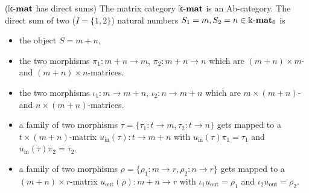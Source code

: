 \begin{example}{($\Bbbk\textnormal{-}\mathbf{mat}$ has direct sums)}\label{ex:kmat_has_direct_sum}
The matrix category $\Bbbk\textnormal{-}\mathbf{mat}$ is an Ab-category. The direct sum of two ($I = \{1,2\}$) natural numbers $S_{1} = m, S_{2} = n \in \Bbbk\textnormal{-}\mathbf{mat}_{0}$ is
\begin{itemize}
\item the object $S = m+n$,
\item the two morphisms $\pi_{1} : m+n \rightarrow m$, $\pi_{2} : m+n \rightarrow n$ which are $(m+n) \times m$- and $(m+n) \times n$-matrices.
\item the two morphisms $\iota_{1} : m \rightarrow m+n$, $\iota_{2} : n \rightarrow m+n$ which are $m \times (m+n)$- and $n \times (m+n)$-matrices.
\item a family of two morphisms $\tau = \{ \tau_{1} : t \rightarrow m, \tau_{2} : t \rightarrow n\}$ gets mapped to a $t \times (m+n)$-matrix
$u_{\text{in}}(\tau) : t \rightarrow m+n$ with $u_{\text{in}}(\tau) \pi_{1} = \tau_{1}$ and $u_{\text{in}}(\tau) \pi_{2} = \tau_{2}$.
\item a family of two morphisms $\rho = \{ \rho_{1} : m \rightarrow r, \rho_{2} : n \rightarrow r \}$ gets mapped to a $(m+n) \times r$-matrix
$u_{\text{out}}(\rho) : m+n \rightarrow r$ with $\iota_{1} u_{\text{out}} = \rho_{1}$ and $\iota_{2} u_{\text{out}} = \rho_{2}$.
\end{itemize}
\end{example}

